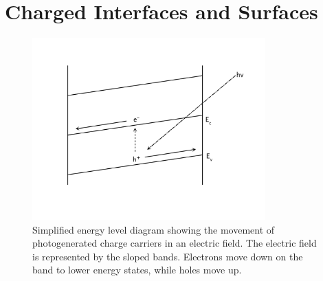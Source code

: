 \section{Charged Interfaces and Surfaces}
\label{sec:background.charged}

\begin{figure}
\begin{center}
\includegraphics[width=0.8\textwidth]{electronholemovement.pdf}
\caption[Movement of photogenerated charge carriers]{%
	Simplified energy level diagram showing the movement of photogenerated charge carriers
in an electric field. The electric field is represented by the sloped bands. Electrons
move down on the band to lower energy states, while holes move up.}
\label{fig:electronholemovement}
\end{center}
\end{figure}


